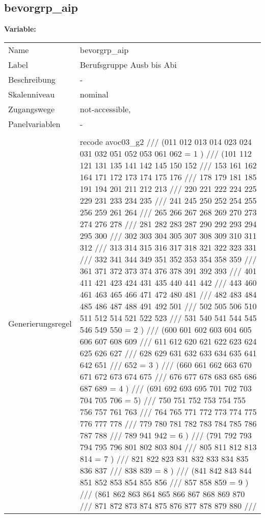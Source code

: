 	
	
	\subsection{bevorgrp\_aip}
	\label{subSection:bevorgrp_aip}

	\noindent\textbf{Variable:}\\
		\begin{tabular}{lL{11.3cm}}
			\label{tableVariable:bevorgrp_aip}
			Name & bevorgrp\_aip \\
			Label & Berufsgruppe Ausb bis Abi \\
			Beschreibung & - \\
			Skalenniveau & nominal \\
			Zugangswege &
				not-accessible,
 \\
			Panelvariablen & -
			 \\
			 \\
					Generierungsregel & recode avoc03\_g2  ///
(011 012 013 014 023 024 031 032 051 052 053 061 062 = 1 ) ///
(101 112 121 131 135 141 142 145 150 152 ///
153 161 162 164 171 172 173 174 175 176 ///
178 179 181 185 191 194 201 211 212 213 ///
220 221 222 224 225 229 231 233 234 235 ///
241 245 250 252 254 255 256 259 261 264 ///
265 266 267 268 269 270 273 274 276 278 ///
281 282 283 287 290 292 293 294 295 300 ///
302 303 304 305 307 308 309 310 311 312 ///
313 314 315 316 317 318 321 322 323 331 ///
332 341 344 349 351 352 353 354 358 359 ///
361 371 372 373 374 376 378 391 392 393 ///
401 411 421 423 424 431 435 440 441 442 ///
443 460 461 463 465 466 471 472 480 481 ///
482 483 484 485 486 487 488 491 492 501 ///
502 505 506 510 511 512 514 521 522 523 ///
531 540 541 544 545 546 549 550 = 2 ) ///
(600 601 602 603 604 605 606 607 608 609 ///
611 612 620 621 622 623 624 625 626 627 ///
628 629 631 632 633 634 635 641 642 651 ///
652 = 3 ) ///
(660 661 662 663 670 671 672 673 674 675 ///
676 677 678 683 685 686 687 689 = 4 ) ///
(691 692 693 695 701 702 703 704 705 706 = 5) ///
750 751 752 753 754 755 756 757 761 763 ///
764 765 771 772 773 774 775 776 777 778 ///
779 780 781 782 783 784 785 786 787 788 ///
789 941 942 = 6 ) ///
(791 792 793 794 795 796 801 802 803 804 ///
805 811 812 813 814 = 7 ) ///
821 822 823 831 832 833 834 835 836 837 ///
838 839 = 8 ) ///
(841 842 843 844 851 852 853 854 855 856 ///
857 858 859 = 9 ) ///
(861 862 863 864 865 866 867 868 869 870 ///
871 872 873 874 875 876 877 878 879 880 ///

\end{tabular}
